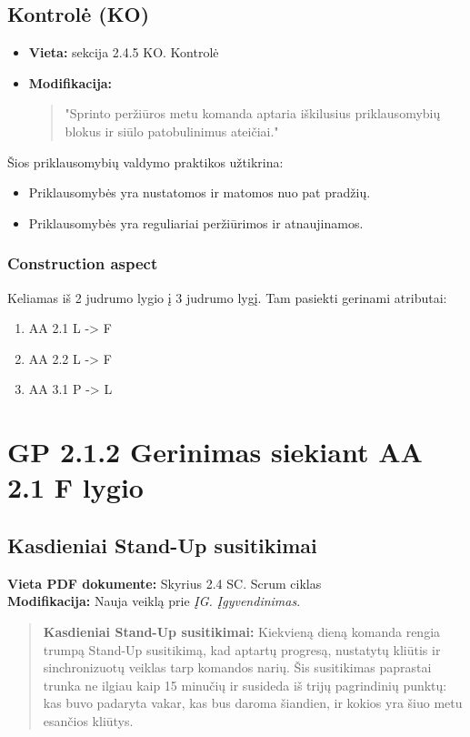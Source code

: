 \documentclass{article}
\begin{document}
\subsection*{Kontrolė (KO)}
\begin{itemize}
    \item \textbf{Vieta:} sekcija 2.4.5 KO. Kontrolė
    \item \textbf{Modifikacija:} 
    \begin{quote}
        "Sprinto peržiūros metu komanda aptaria iškilusius priklausomybių blokus ir siūlo patobulinimus ateičiai."
    \end{quote}
\end{itemize}


Šios priklausomybių valdymo praktikos užtikrina:
\begin{itemize}
    \item Priklausomybės yra nustatomos ir matomos nuo pat pradžių.
    \item Priklausomybės yra reguliariai peržiūrimos ir atnaujinamos.
\end{itemize}

\subsubsection{Construction aspect}

Keliamas iš 2 judrumo lygio į 3 judrumo lygį. Tam pasiekti gerinami atributai:
\begin{enumerate}
\item AA 2.1 L -> F 
\item AA 2.2 L -> F 
\item AA 3.1 P -> L 
\end{enumerate}

\section*{GP 2.1.2 Gerinimas siekiant AA 2.1 F lygio}

\subsection*{Kasdieniai Stand-Up susitikimai}
\textbf{Vieta PDF dokumente:} Skyrius 2.4 SC. Scrum ciklas \\
\textbf{Modifikacija:} Nauja veiklą prie \textit{ĮG. Įgyvendinimas}.
\begin{quote}
\textbf{Kasdieniai Stand-Up susitikimai:} Kiekvieną dieną komanda rengia trumpą Stand-Up susitikimą, kad aptartų progresą, nustatytų kliūtis ir sinchronizuotų veiklas tarp komandos narių. Šis susitikimas paprastai trunka ne ilgiau kaip 15 minučių ir susideda iš trijų pagrindinių punktų: kas buvo padaryta vakar, kas bus daroma šiandien, ir kokios yra šiuo metu esančios kliūtys.
\end{quote}
\end{document}
